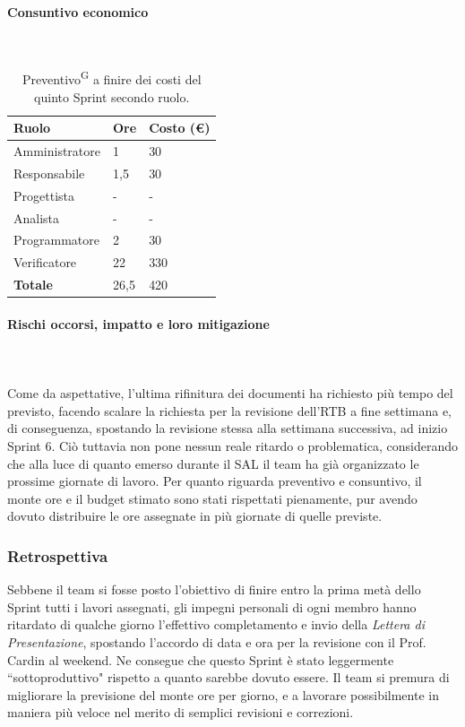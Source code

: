 \documentclass[8pt]{article}
\newcommand{\glossterm}[1]{#1\textsuperscript{G}} %
\newcommand{\subsubsubsection}[1]{\paragraph{#1}\mbox{}\\}
\begin{document}
\subsubsubsection{Consuntivo economico}
\begin{table}[ht!]
    \centering
    \begin{tabular}{p{4cm} p{1.8cm} p{2.2cm}}
        \toprule
        \textbf{Ruolo} & \textbf{Ore} & \textbf{Costo (€)} \\
        \midrule
        Amministratore & 1 & 30 \\
        Responsabile & 1,5  & 30 \\
        Progettista & -  & - \\
        Analista & - & - \\
        Programmatore & 2 & 30 \\
        Verificatore & 22 & 330 \\
        \midrule
        \textbf{Totale} & 26,5 & 420 \\
        \bottomrule
    \end{tabular}
    \caption{\glossterm{Preventivo} a finire dei costi del quinto Sprint secondo ruolo.}
    \label{table:Preventivo a finire dei costi del quinto Sprint secondo ruolo}
\end{table}
\subsubsubsection{Rischi occorsi, impatto e loro mitigazione}\\
Come da aspettative, l'ultima rifinitura dei documenti ha richiesto più tempo del previsto, facendo scalare la richiesta per la revisione dell'RTB a fine settimana e, di conseguenza,
spostando la revisione stessa alla settimana successiva, ad inizio Sprint 6. Ciò tuttavia non pone nessun reale ritardo o problematica, considerando che alla luce di quanto emerso durante il SAL il team ha già 
organizzato le prossime giornate di lavoro. Per quanto riguarda preventivo e consuntivo, il monte ore e il budget stimato sono stati rispettati pienamente, pur avendo dovuto distribuire 
le ore assegnate in più giornate di quelle previste. 

\subsubsection{Retrospettiva}

Sebbene il team si fosse posto l'obiettivo di finire entro la prima metà dello Sprint tutti i lavori assegnati, gli impegni personali di ogni membro hanno ritardato di qualche giorno l'effettivo completamento
e invio della \textit{Lettera di Presentazione}, spostando l'accordo di data e ora per la revisione con il Prof. Cardin al weekend. Ne consegue che questo Sprint è stato leggermente
``sottoproduttivo" rispetto a quanto sarebbe dovuto essere. Il team si premura di migliorare la previsione del monte ore per giorno, e a lavorare possibilmente in maniera più veloce nel merito di semplici revisioni e correzioni.
\end{document}

